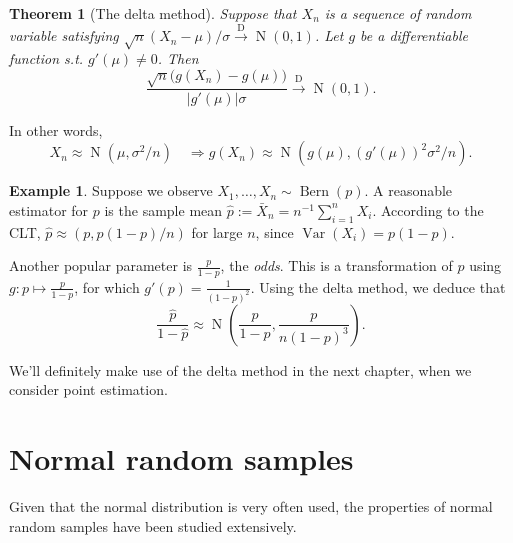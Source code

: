 \documentclass[
]{book}
\DeclareMathOperator{\Var}{Var}
\DeclareMathOperator{\N}{N}
\DeclareMathOperator{\Bern}{Bern}
\newtheorem{theorem}{Theorem}[chapter]
\theoremstyle{definition}
\theoremstyle{definition}
\newtheorem{example}{Example}[chapter]
\theoremstyle{definition}
\theoremstyle{definition}
\theoremstyle{remark}
\begin{document}
\begin{theorem}[The delta method]
Suppose that \(X_n\) is a sequence of random variable satisfying \(\sqrt n(X_n - \mu)/\sigma {\xrightarrow{\text{D}}} \N(0,1)\).
Let \(g\) be a differentiable function s.t. \(g'(\mu)\neq 0\). Then
\[
\frac{\sqrt n \big(g(X_n)-g(\mu)\big)}{|g'(\mu)|\sigma} {\xrightarrow{\text{D}}} \N(0,1).
\]
\end{theorem}

In other words,
\[
  X_n \approx \N\left( \mu, \sigma^2/n \right) \hspace{1em} \Rightarrow g(X_n) \approx \N \left( g(\mu), (g'(\mu))^2\sigma^2/n \right).
\]

\begin{example}
Suppose we observe \(X_1,\dots,X_n\sim\Bern(p)\).
A reasonable estimator for \(p\) is the sample mean \(\hat p := \bar X_n = n^{-1}\sum_{i=1}^n X_i\).
According to the CLT, \(\hat p \approx (p, p(1-p)/n)\) for large \(n\), since \(\Var(X_i)=p(1-p)\).

Another popular parameter is \(\frac{p}{1-p}\), the \textit{odds}.
This is a transformation of \(p\) using \(g:p \mapsto \frac{p}{1-p}\), for which \(g'(p) = \frac{1}{(1-p)^2}\).
Using the delta method, we deduce that
\[
\frac{\hat p}{1-\hat p} \approx \N \left(\frac{p}{1-p}, \frac{p}{n(1-p)^3}  \right).
\]
\end{example}

We'll definitely make use of the delta method in the next chapter, when we consider point estimation.

\hypertarget{normal-random-samples}{%
\section{Normal random samples}\label{normal-random-samples}}

Given that the normal distribution is very often used, the properties of normal random samples have been studied extensively.
\end{document}
